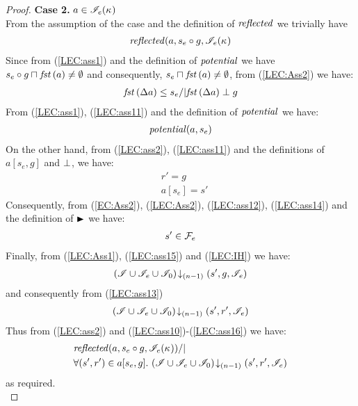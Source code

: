 \begin{lemma}
\begin{proof}
\noindent\textbf{Case 2. }$a \in \mathscr{I}_e(\kappa_{})$\\
From the assumption of the case and the definition of $\mathit{reflected}$ we trivially have
%
\begin{align}
	\mathit{reflected}(a, s_e \circ g, \mathscr{I}_e(\kappa_{})
	\label{LEC:ass10}
\end{align}
%
Since from (\ref{LEC:ass1}) and the definition of $\mathit{potential}$ we have $s_e \circ g \sqcap_{} \mathit{fst}\left(a\right) \not= \emptyset$ and consequently, $s_e \sqcap_{} \mathit{fst}\left(a\right) \not= \emptyset$, from (\ref{LEC:Ass2}) we have:
%
\begin{align}
	\mathit{fst}\left(\Delta {a}\right) \leq s_e /| \mathit{fst}\left(\Delta {a}\right) \mathrel{\bot} g\label{LEC:ass11}
\end{align}
% 
From (\ref{LEC:ass1}), (\ref{LEC:ass11}) and the definition of $\mathit{potential}$ we have:
%
\begin{align}
	\mathit{potential}(a, s_e) \label{LEC:ass12}
\end{align}
%
On the other hand, from (\ref{LEC:ass2}), (\ref{LEC:ass11}) and the definitions of $a[s_e, g]$ and $\mathrel{\bot}$, we have: 
%
\begin{align}
	& r' = g \label{LEC:ass13}\\
	& a[s_e] = s' \label{LEC:ass14}
\end{align}
%
Consequently, from (\ref{EC:Ass2}), (\ref{LEC:Ass2}), (\ref{LEC:ass12}), (\ref{LEC:ass14}) and the definition of $\strictfences$ we have:
%
\begin{align}
	s' \in  \mathcal{F}_{e}  \label{LEC:ass15}
\end{align}
%
Finally, from (\ref{LEC:Ass1}), (\ref{LEC:ass15}) and (\ref{LEC:IH}) we have:
%
\begin{align*}
	\left(\mathscr{I} \cup \mathscr{I}_{e} \cup \mathscr{I}_0\right) \!\downarrow_{(n-1)} \left(s', g, \mathscr{I}_e\right)
\end{align*}
%
and consequently from (\ref{LEC:ass13})
%
\begin{align}
	\left(\mathscr{I} \cup \mathscr{I}_{e} \cup \mathscr{I}_0\right) \!\downarrow_{(n-1)} \left(s', r', \mathscr{I}_e\right)
	\label{LEC:ass16}
\end{align}
%
Thus from (\ref{LEC:ass2}) and (\ref{LEC:ass10})-(\ref{LEC:ass16}) we have:
%
\begin{align*}
	& \mathit{reflected}(a, s_e \circ g, \mathscr{I}_e(\kappa_{})) /| \\
	& \forall (s', r') \in a[s_e, g].\, \left(\mathscr{I} \cup \mathscr{I}_e \cup \mathscr{I}_0\right) \!\downarrow_{(n-1)} \left(s', r', \mathscr{I}_e\right)
\end{align*}
%
as required.\\

\end{proof}
\end{lemma}
%
%
%
%
%
%
%
%
%
%
%

